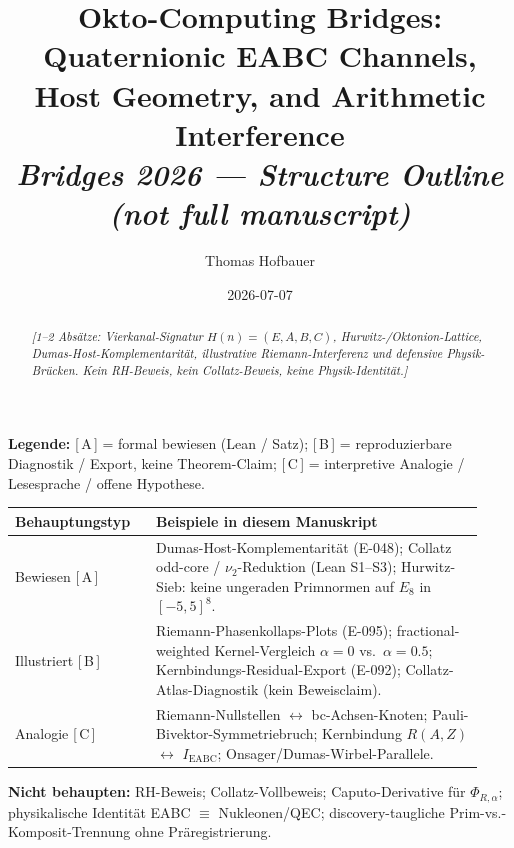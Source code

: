 \documentclass[11pt,a4paper]{article}
\title{Okto-Computing Bridges:\\
  Quaternionic EABC Channels, Host Geometry, and Arithmetic Interference\\
  \large\textit{Bridges 2026 --- Structure Outline (not full manuscript)}}
\author{Thomas Hofbauer}
\date{2026-07-07}
\newcommand{\evidence}[1]{\textnormal{[\,#1\,]}}
\newcommand{\placeholder}[1]{\textit{[#1]}}
\begin{document}
\maketitle

\begin{abstract}
\placeholder{1--2 Absätze: Vierkanal-Signatur $H(n)=(E,A,B,C)$, Hurwitz-/Oktonion-Lattice,
Dumas-Host-Komplementarität, illustrative Riemann-Interferenz und defensive Physik-Brücken.
Kein RH-Beweis, kein Collatz-Beweis, keine Physik-Identität.}
\end{abstract}

\begin{tcolorbox}[colback=gray!5,colframe=gray!60,title={Governance: Was ist bewiesen vs.\ illustriert vs.\ Analogie}]
\textbf{Legende:}
\evidence{A} = formal bewiesen (Lean / Satz);
\evidence{B} = reproduzierbare Diagnostik / Export, keine Theorem-Claim;
\evidence{C} = interpretive Analogie / Lesesprache / offene Hypothese.

\medskip
\begin{tabular}{@{}p{0.28\linewidth}p{0.65\linewidth}@{}}
\toprule
\textbf{Behauptungstyp} & \textbf{Beispiele in diesem Manuskript} \\
\midrule
Bewiesen \evidence{A} &
Dumas-Host-Komplementarität (E-048);
Collatz odd-core / $\nu_2$-Reduktion (Lean S1--S3);
Hurwitz-Sieb: keine ungeraden Primnormen auf $E_8$ in $[-5,5]^8$. \\
Illustriert \evidence{B} &
Riemann-Phasenkollaps-Plots (E-095);
fractional-weighted Kernel-Vergleich $\alpha{=}0$ vs.\ $\alpha{=}0.5$;
Kernbindungs-Residual-Export (E-092);
Collatz-Atlas-Diagnostik (kein Beweisclaim). \\
Analogie \evidence{C} &
Riemann-Nullstellen $\leftrightarrow$ bc-Achsen-Knoten;
Pauli-Bivektor-Symmetriebruch;
Kernbindung $R(A,Z)$ $\leftrightarrow$ $I_{\mathrm{EABC}}$;
Onsager/Dumas-Wirbel-Parallele. \\
\bottomrule
\end{tabular}

\medskip
\textbf{Nicht behaupten:}
RH-Beweis; Collatz-Vollbeweis; Caputo-Derivative für $\Phi_{R,\alpha}$;
physikalische Identität EABC $\equiv$ Nukleonen/QEC; discovery-taugliche
Prim-vs.-Komposit-Trennung ohne Präregistrierung.
\end{tcolorbox}

\tableofcontents
\newpage
\end{document}
